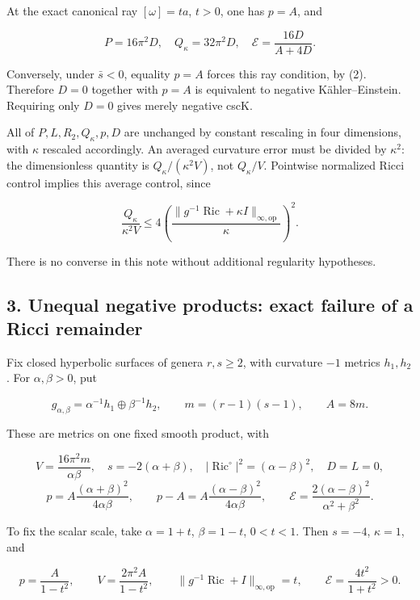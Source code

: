 \documentclass[
  11pt,
]{article}
\begin{document}
At the exact canonical ray \([\omega]=t a\), \(t>0\), one has \(p=A\),
and

\[
 P=16\pi^2D,\quad Q_\kappa=32\pi^2D,\quad
 \mathcal E=\frac{16D}{A+4D}.
 \tag{12}
\]

Conversely, under \(\bar s<0\), equality \(p=A\) forces this ray
condition, by (2). Therefore \(D=0\) together with \(p=A\) is equivalent
to negative Kähler--Einstein. Requiring only \(D=0\) gives merely
negative cscK.

All of \(P,L,R_2,Q_\kappa,p,D\) are unchanged by constant rescaling in
four dimensions, with \(\kappa\) rescaled accordingly. An averaged
curvature error must be divided by \(\kappa^2\): the dimensionless
quantity is \(Q_\kappa/(\kappa^2V)\), not \(Q_\kappa/V\). Pointwise
normalized Ricci control implies this average control, since

\[
 \frac{Q_\kappa}{\kappa^2V}
 \le4\left(\frac{\|g^{-1}\operatorname{Ric}+\kappa I\|_{\infty,\mathrm{op}}}
 {\kappa}\right)^2.
 \tag{13}
\]

There is no converse in this note without additional regularity
hypotheses.

\hypertarget{unequal-negative-products-exact-failure-of-a-ricci-remainder}{%
\subsection{3. Unequal negative products: exact failure of a Ricci
remainder}\label{unequal-negative-products-exact-failure-of-a-ricci-remainder}}

Fix closed hyperbolic surfaces of genera \(r,s\ge2\), with curvature
\(-1\) metrics \(h_1,h_2\). For \(\alpha,\beta>0\), put

\[
 g_{\alpha,\beta}=\alpha^{-1}h_1\oplus\beta^{-1}h_2,
 \qquad m=(r-1)(s-1),\qquad A=8m.
\]

These are metrics on one fixed smooth product, with

\[
 V=\frac{16\pi^2m}{\alpha\beta},\quad
 s=-2(\alpha+\beta),\quad
 |\operatorname{Ric}^{\circ}|^2=(\alpha-\beta)^2,\quad D=L=0,
\] \[
 p=A\frac{(\alpha+\beta)^2}{4\alpha\beta},\qquad
 p-A=A\frac{(\alpha-\beta)^2}{4\alpha\beta},\qquad
 \mathcal E=\frac{2(\alpha-\beta)^2}{\alpha^2+\beta^2}.
 \tag{14}
\]

To fix the scalar scale, take \(\alpha=1+t\), \(\beta=1-t\), \(0<t<1\).
Then \(s=-4\), \(\kappa=1\), and

\[
 p=\frac A{1-t^2},\qquad
 V=\frac{2\pi^2 A}{1-t^2},\qquad
 \|g^{-1}\operatorname{Ric}+I\|_{\infty,\mathrm{op}}=t,
 \qquad \mathcal E=\frac{4t^2}{1+t^2}>0.
 \tag{15}
\]
\end{document}
